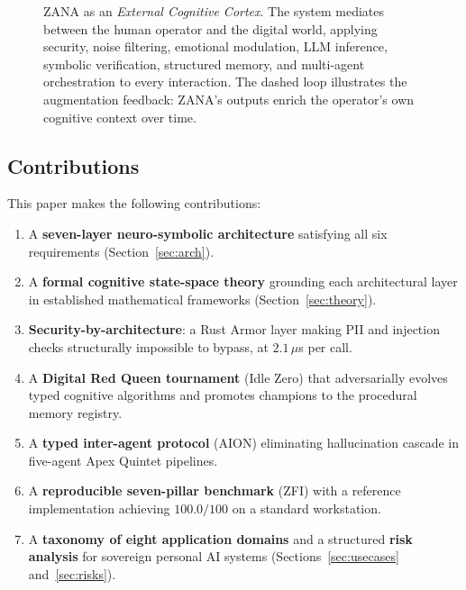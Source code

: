 \documentclass[12pt,a4paper]{article}
\begin{document}
\begin{figure}[H]
{%
}
\caption{ZANA as an \emph{External Cognitive Cortex}. The system mediates between the human
operator and the digital world, applying security, noise filtering, emotional modulation, LLM
inference, symbolic verification, structured memory, and multi-agent orchestration to every
interaction. The dashed loop illustrates the augmentation feedback: ZANA's outputs enrich the
operator's own cognitive context over time.}
\label{fig:overview}
\end{figure}

\subsection*{Contributions}

This paper makes the following contributions:

\begin{enumerate}[leftmargin=*, label=\textbf{C\arabic*.}]
  \item A \textbf{seven-layer neuro-symbolic architecture} satisfying all six requirements
    (Section~\ref{sec:arch}).
  \item A \textbf{formal cognitive state-space theory} grounding each architectural layer in
    established mathematical frameworks (Section~\ref{sec:theory}).
  \item \textbf{Security-by-architecture}: a Rust Armor layer making PII and injection checks
    structurally impossible to bypass, at $2.1\,\mu$s per call.
  \item A \textbf{Digital Red Queen tournament} (Idle Zero) that adversarially evolves typed
    cognitive algorithms and promotes champions to the procedural memory registry.
  \item A \textbf{typed inter-agent protocol} (AION) eliminating hallucination cascade in
    five-agent Apex Quintet pipelines.
  \item A \textbf{reproducible seven-pillar benchmark} (ZFI) with a reference implementation
    achieving $100.0/100$ on a standard workstation.
  \item A \textbf{taxonomy of eight application domains} and a structured \textbf{risk
    analysis} for sovereign personal AI systems (Sections~\ref{sec:usecases}
    and~\ref{sec:risks}).
\end{enumerate}
\end{document}
